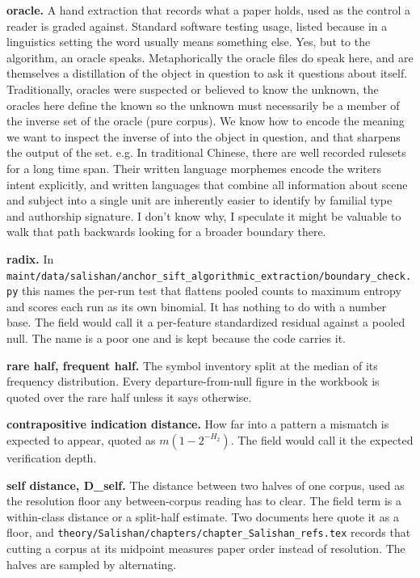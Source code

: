 \noindent\textbf{oracle.} A hand extraction that records what a paper holds, used as the control a reader is graded against. Standard software testing usage, listed because in a linguistics setting the word usually means something else. Yes, but to the algorithm, an oracle speaks. Metaphorically the oracle files do speak here, and are themselves a distillation of the object in question to ask it questions about itself. Traditionally, oracles were suspected or believed to know the unknown, the oracles here define the known so the unknown must necessarily be a member of the inverse set of the oracle (pure corpus). We know how to encode the meaning we want to inspect the inverse of into the object in question, and that sharpens the output of the set. e.g. In traditional Chinese, there are well recorded rulesets for a long time span. Their written language morphemes encode the writers intent explicitly, and written languages that combine all information about scene and subject into a single unit are inherently easier to identify by familial type and authorship signature. I don't know why, I speculate it might be valuable to walk that path backwards looking for a broader boundary there.

\noindent\textbf{radix.} In \texttt{maint/\allowbreak{}data/\allowbreak{}salishan/\allowbreak{}anchor\_\allowbreak{}sift\_\allowbreak{}algorithmic\_\allowbreak{}extraction/\allowbreak{}boundary\_\allowbreak{}check.\allowbreak{}py} this names the per-run test that flattens pooled counts to maximum entropy and scores each run as its own binomial. It has nothing to do with a number base. The field would call it a per-feature standardized residual against a pooled null. The name is a poor one and is kept because the code carries it.

\noindent\textbf{rare half, frequent half.} The symbol inventory split at the median of its frequency distribution. Every departure-from-null figure in the workbook is quoted over the rare half unless it says otherwise.

\noindent\textbf{contrapositive indication distance.} How far into a pattern a mismatch is expected to appear, quoted as \(m(1-2^{-H_2})\). The field would call it the expected verification depth.

\noindent\textbf{self distance, D\_self.} The distance between two halves of one corpus, used as the resolution floor any between-corpus reading has to clear. The field term is a within-class distance or a split-half estimate. Two documents here quote it as a floor, and \texttt{theory/\allowbreak{}Salishan/\allowbreak{}chapters/\allowbreak{}chapter\_\allowbreak{}Salishan\_\allowbreak{}refs.\allowbreak{}tex} records that cutting a corpus at its midpoint measures paper order instead of resolution. The halves are sampled by alternating.

